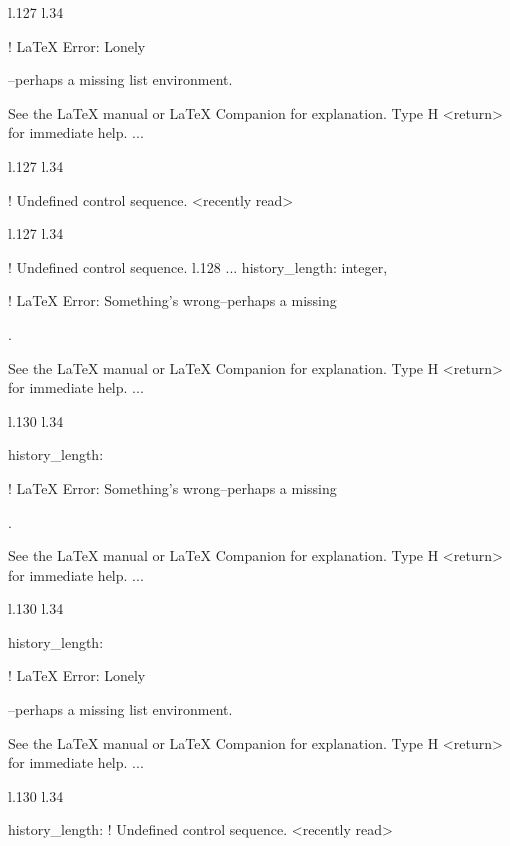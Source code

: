 {{{{{{{{{{{{{{{{{{l.127 l.34     \item \xmlNode
                             

! LaTeX Error: Lonely \item--perhaps a missing list environment.

See the LaTeX manual or LaTeX Companion for explanation.
Type  H <return>  for immediate help.
 ...                                              
                                                  
l.127 l.34     \item \xmlNode
                             
! Undefined control sequence.
<recently read> \xmlNode 
                         
l.127 l.34     \item \xmlNode
                             
! Undefined control sequence.
l.128 ...              {history\_length}: \xmlDesc
                                                  {integer},

! LaTeX Error: Something's wrong--perhaps a missing \item.

See the LaTeX manual or LaTeX Companion for explanation.
Type  H <return>  for immediate help.
 ...                                              
                                                  
l.130 l.34     \item \xmlNode
                             {history\_length}: \xmlDesc

! LaTeX Error: Something's wrong--perhaps a missing \item.

See the LaTeX manual or LaTeX Companion for explanation.
Type  H <return>  for immediate help.
 ...                                              
                                                  
l.130 l.34     \item \xmlNode
                             {history\_length}: \xmlDesc

! LaTeX Error: Lonely \item--perhaps a missing list environment.

See the LaTeX manual or LaTeX Companion for explanation.
Type  H <return>  for immediate help.
 ...                                              
                                                  
l.130 l.34     \item \xmlNode
                             {history\_length}: \xmlDesc
! Undefined control sequence.
<recently read> \xmlNode 
                         
}}}}}}}}}}}}}}}}}}

